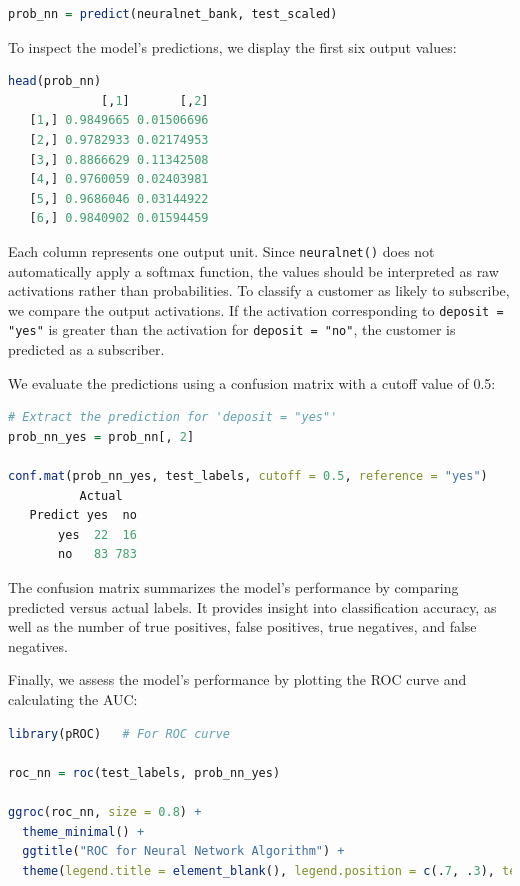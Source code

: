 \documentclass[
  11pt,
]{book}
\newcommand{\passthrough}[1]{#1}
\theoremstyle{definition}
\theoremstyle{definition}
\theoremstyle{definition}
\theoremstyle{definition}
\theoremstyle{remark}
\begin{document}
\begin{lstlisting}[language=R]
prob_nn = predict(neuralnet_bank, test_scaled)
\end{lstlisting}

To inspect the model's predictions, we display the first six output values:

\begin{lstlisting}[language=R]
head(prob_nn)
             [,1]       [,2]
   [1,] 0.9849665 0.01506696
   [2,] 0.9782933 0.02174953
   [3,] 0.8866629 0.11342508
   [4,] 0.9760059 0.02403981
   [5,] 0.9686046 0.03144922
   [6,] 0.9840902 0.01594459
\end{lstlisting}

Each column represents one output unit. Since \passthrough{\lstinline!neuralnet()!} does not automatically apply a softmax function, the values should be interpreted as raw activations rather than probabilities. To classify a customer as likely to subscribe, we compare the output activations. If the activation corresponding to \passthrough{\lstinline!deposit = "yes"!} is greater than the activation for \passthrough{\lstinline!deposit = "no"!}, the customer is predicted as a subscriber.

We evaluate the predictions using a confusion matrix with a cutoff value of 0.5:

\begin{lstlisting}[language=R]
# Extract the prediction for 'deposit = "yes"'
prob_nn_yes = prob_nn[, 2] 

conf.mat(prob_nn_yes, test_labels, cutoff = 0.5, reference = "yes")
          Actual
   Predict yes  no
       yes  22  16
       no   83 783
\end{lstlisting}

The confusion matrix summarizes the model's performance by comparing predicted versus actual labels. It provides insight into classification accuracy, as well as the number of true positives, false positives, true negatives, and false negatives.

Finally, we assess the model's performance by plotting the ROC curve and calculating the AUC:

\begin{lstlisting}[language=R]
library(pROC)   # For ROC curve

roc_nn = roc(test_labels, prob_nn_yes)

ggroc(roc_nn, size = 0.8) + 
  theme_minimal() + 
  ggtitle("ROC for Neural Network Algorithm") +
  theme(legend.title = element_blank(), legend.position = c(.7, .3), text = element_text(size = 17))
\end{lstlisting}
\end{document}
